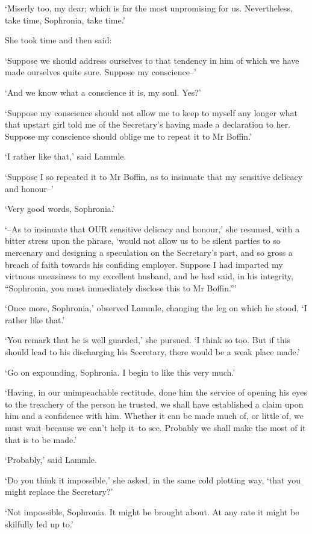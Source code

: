 ‘Miserly too, my dear; which is far the most unpromising for us.
Nevertheless, take time, Sophronia, take time.’

She took time and then said:

‘Suppose we should address ourselves to that tendency in him of which we
have made ourselves quite sure. Suppose my conscience--’

‘And we know what a conscience it is, my soul. Yes?’

‘Suppose my conscience should not allow me to keep to myself any
longer what that upstart girl told me of the Secretary’s having made a
declaration to her. Suppose my conscience should oblige me to repeat it
to Mr Boffin.’

‘I rather like that,’ said Lammle.

‘Suppose I so repeated it to Mr Boffin, as to insinuate that my
sensitive delicacy and honour--’

‘Very good words, Sophronia.’

‘--As to insinuate that OUR sensitive delicacy and honour,’ she resumed,
with a bitter stress upon the phrase, ‘would not allow us to be silent
parties to so mercenary and designing a speculation on the Secretary’s
part, and so gross a breach of faith towards his confiding employer.
Suppose I had imparted my virtuous uneasiness to my excellent husband,
and he had said, in his integrity, “Sophronia, you must immediately
disclose this to Mr Boffin.”’

‘Once more, Sophronia,’ observed Lammle, changing the leg on which he
stood, ‘I rather like that.’

‘You remark that he is well guarded,’ she pursued. ‘I think so too. But
if this should lead to his discharging his Secretary, there would be a
weak place made.’

‘Go on expounding, Sophronia. I begin to like this very much.’

‘Having, in our unimpeachable rectitude, done him the service of opening
his eyes to the treachery of the person he trusted, we shall have
established a claim upon him and a confidence with him. Whether it
can be made much of, or little of, we must wait--because we can’t help
it--to see. Probably we shall make the most of it that is to be made.’

‘Probably,’ said Lammle.

‘Do you think it impossible,’ she asked, in the same cold plotting way,
‘that you might replace the Secretary?’

‘Not impossible, Sophronia. It might be brought about. At any rate it
might be skilfully led up to.’

